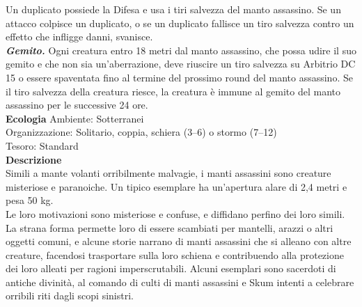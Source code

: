 \begin{multicols}{2}
Un duplicato possiede la Difesa e usa i tiri salvezza del manto assassino. Se un attacco colpisce un duplicato, o se un duplicato fallisce un tiro salvezza contro un effetto che infligge danni, svanisce.\\
\emph{\textbf{Gemito.}} Ogni creatura entro 18 metri dal manto assassino, che possa udire il suo gemito e che non sia un'aberrazione, deve riuscire un tiro salvezza su Arbitrio DC  15 o essere spaventata fino al termine del prossimo round del manto assassino. Se il tiro salvezza della creatura riesce, la creatura è immune al gemito del manto assassino per le successive 24 ore.\\
\textbf{Ecologia}
Ambiente: Sotterranei\\
Organizzazione: Solitario, coppia, schiera (3–6) o stormo (7–12)\\
Tesoro: Standard\\
\textbf{Descrizione}\\
Simili a mante volanti orribilmente malvagie, i manti assassini sono creature misteriose e paranoiche. Un tipico esemplare ha un’apertura alare di 2,4 metri e pesa 50 kg.\\

Le loro motivazioni sono misteriose e confuse, e diffidano perfino dei loro simili. La strana forma permette loro di essere scambiati per mantelli, arazzi o altri oggetti comuni, e alcune storie narrano di manti assassini che si alleano con altre creature, facendosi trasportare sulla loro schiena e contribuendo alla protezione dei loro alleati per ragioni imperscrutabili. Alcuni esemplari sono sacerdoti di antiche divinità, al comando di culti di manti assassini e Skum intenti a celebrare orribili riti dagli scopi sinistri.\\



\end{multicols}
